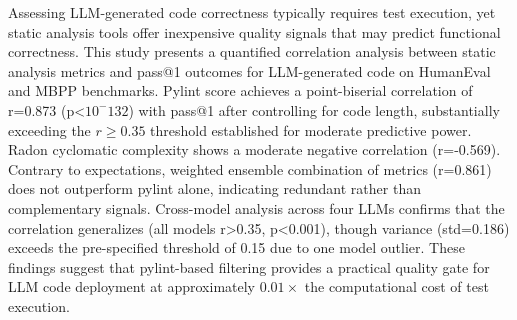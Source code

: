 
Assessing LLM-generated code correctness typically requires test execution, yet static analysis tools offer inexpensive quality signals that may predict functional correctness. This study presents a quantified correlation analysis between static analysis metrics and pass@1 outcomes for LLM-generated code on HumanEval and MBPP benchmarks. Pylint score achieves a point-biserial correlation of r=0.873 (p<$10^-132$) with pass@1 after controlling for code length, substantially exceeding the $r\geq 0.35$ threshold established for moderate predictive power. Radon cyclomatic complexity shows a moderate negative correlation (r=-0.569). Contrary to expectations, weighted ensemble combination of metrics (r=0.861) does not outperform pylint alone, indicating redundant rather than complementary signals. Cross-model analysis across four LLMs confirms that the correlation generalizes (all models r>0.35, p<0.001), though variance (std=0.186) exceeds the pre-specified threshold of 0.15 due to one model outlier. These findings suggest that pylint-based filtering provides a practical quality gate for LLM code deployment at approximately 0.$01\times$ the computational cost of test execution.
